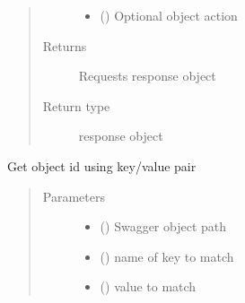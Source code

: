 \documentclass[letterpaper,10pt,english]{sphinxmanual}
\begin{document}
\begin{fulllineitems}
\begin{fulllineitems}
\begin{quote}
\begin{description}
\begin{itemize}
\item {} 
\sphinxAtStartPar
{} () \textendash{} Optional object action

\end{itemize}

\item[{Returns}] \leavevmode
\sphinxAtStartPar
Requests response object

\item[{Return type}] \leavevmode
\sphinxAtStartPar
response object

\end{description}\end{quote}

\end{fulllineitems}


\begin{fulllineitems}
\label{\detokenize{b1tdc-class:bloxone.b1tdc.get_id}}
\sphinxAtStartPar
Get object id using key/value pair
\begin{quote}\begin{description}
\item[{Parameters}] \leavevmode\begin{itemize}
\item {} 
\sphinxAtStartPar
{} () \textendash{} Swagger object path

\item {} 
\sphinxAtStartPar
{} () \textendash{} name of key to match

\item {} 
\sphinxAtStartPar
{} () \textendash{} value to match

\end{itemize}


\end{description}
\end{quote}
\end{fulllineitems}
\end{fulllineitems}
\end{document}
